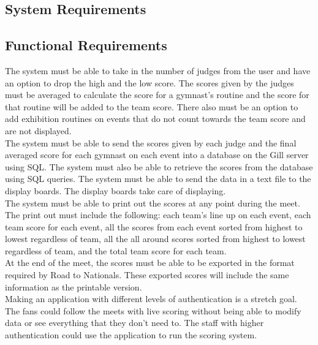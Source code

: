 \documentclass[letterpaper,10pt,draftclsnofoot,onecolumn,]{article}
\begin{document}
\begin{center}
\section{System Requirements}
\end{center}

\subsection{Functional Requirements}
The system must be able to take in the number of judges from the user and have an option to drop the high and the low score. The scores given by the judges must be averaged to calculate the score for a gymnast's routine and the score for that routine will be added to the team score. There also must be an option to add exhibition routines on events that do not count towards the team score and are not displayed.\\

\noindent The system must be able to send the scores given by each judge and the final averaged score for each gymnast on each event into a database on the Gill server using SQL. The system must also be able to retrieve the scores from the database using SQL queries. The system must be able to send the data in a text file to the display boards. The display boards take care of displaying.\\

\noindent The system must be able to print out the scores at any point during the meet. The print out must include the following: each team's line up on each event, each team score for each event, all the scores from each event sorted from highest to lowest regardless of team, all the all around scores sorted from highest to lowest regardless of team, and the total team score for each team.\\

\noindent At the end of the meet, the scores must be able to be exported in the format required by Road to Nationals. These exported scores will include the same information as the printable version.\\

\noindent Making an application with different levels of authentication is a stretch goal. The fans could follow the meets with live scoring without being able to modify data or see everything that they don't need to. The staff with higher authentication could use the application to run the scoring system.
\end{document}
